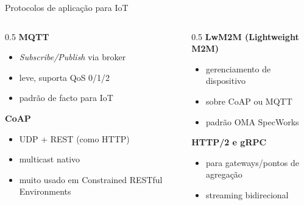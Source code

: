 \documentclass[aspectratio=169,11pt]{beamer}
\begin{document}
\begin{frame}{Protocolos de aplicação para IoT}
  \begin{columns}
    \begin{column}{0.5\textwidth}
      \textbf{MQTT}
      \begin{itemize}
        \item \emph{Subscribe/Publish} via broker
        \item leve, suporta QoS 0/1/2
        \item padrão de facto para IoT
      \end{itemize}
      \textbf{CoAP}
      \begin{itemize}
        \item UDP + REST (como HTTP)
        \item multicast nativo
        \item muito usado em Constrained RESTful Environments
      \end{itemize}
    \end{column}
    \begin{column}{0.5\textwidth}
      \textbf{LwM2M (Lightweight M2M)}
      \begin{itemize}
        \item gerenciamento de dispositivo
        \item sobre CoAP ou MQTT
        \item padrão OMA SpecWorks
      \end{itemize}
      \textbf{HTTP/2 e gRPC}
      \begin{itemize}
        \item para gateways/pontos de agregação
        \item streaming bidirecional
      \end{itemize}
    \end{column}
  \end{columns}
\end{frame}
\end{document}
